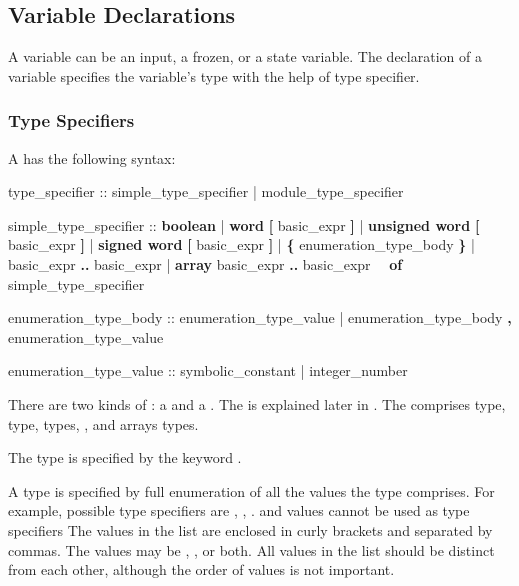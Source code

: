 \subsection{Variable Declarations}
\label{Variable Declarations}

A variable can be an input, a frozen, or a state variable. 
%
The declaration of a variable specifies the variable's type with the
help of type specifier.

\subsubsection{Type Specifiers}
\label{Type Specifiers}
%
A  has the following syntax:
%
\begin{Grammar}
type_specifier ::
        simple_type_specifier
      | module_type_specifier

simple_type_specifier :: 
        \textbf{boolean}
      | \textbf{word} \textbf{[} basic_expr \textbf{]} 
      | \textbf{unsigned word} \textbf{[} basic_expr \textbf{]} 
      | \textbf{signed word} \textbf{[} basic_expr \textbf{]} 
      | \textbf{\{} enumeration_type_body \textbf{\}}
      | basic_expr \textbf{..} basic_expr
      | \textbf{array} basic_expr \textbf{..} basic_expr
        \ \ \textbf{of} simple_type_specifier

enumeration_type_body ::
        enumeration_type_value
      | enumeration_type_body \textbf{,} enumeration_type_value

enumeration_type_value ::
        symbolic_constant
      | integer_number
\end{Grammar}
% 
There are two kinds of : a  and a . 
%
The  is explained later in
.
%
The  comprises \Boolean type, \Integer
type, \Enum types, \UWord, \SWord and arrays 
types.

The \Boolean type is specified by the keyword . 

A \Enum type is specified by full enumeration of all the values the
type comprises. 
%
For example, possible \Enum type specifiers are ,
, .  and 
 values cannot be used as \Enum type specifiers
%
The values in the list are enclosed in curly brackets and separated by
commas.
%
The values may be , , or both.
%
All values in the list should be distinct from each other, although the
order of values is not important. 

